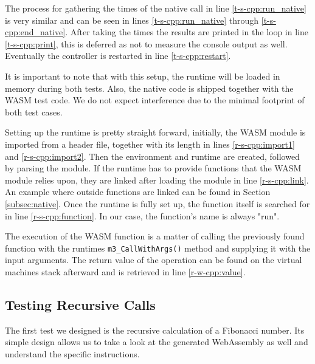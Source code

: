 The process for gathering the times of the native call in line \ref{t-s-cpp:run_native} is very similar and can be seen in lines \ref{t-s-cpp:run_native} through \ref{t-s-cpp:end_native}. After taking the times the results are printed in the loop in line \ref{t-s-cpp:print}, this is deferred as not to measure the console output as well. Eventually the controller is restarted in line \ref{t-s-cpp:restart}.

It is important to note that with this setup, the runtime will be loaded in memory during both tests. Also, the native code is shipped together with the WASM test code. We do not expect interference due to the minimal footprint of both test cases.



Setting up the runtime is pretty straight forward, initially, the WASM module is imported from a header file, together with its length in lines \ref{r-s-cpp:import1} and \ref{r-s-cpp:import2}. Then the environment and runtime are created, followed by parsing the module. If the runtime has to provide functions that the WASM module relies upon, they are linked after loading the module in line \ref{r-s-cpp:link}. An example where outside functions are linked can be found in Section \ref{subsec:native}. Once the runtime is fully set up, the function itself is searched for in line \ref{r-s-cpp:function}. In our case, the function's name is always "run".



The execution of the WASM function is a matter of calling the previously found function with the runtimes \lstinline{m3_CallWithArgs()} method and supplying it with the input arguments. The return value of the operation can be found on the virtual machines stack afterward and is retrieved in line \ref{r-w-cpp:value}.

\subsection{Testing Recursive Calls}\label{subsec:m_test_recursive}

The first test we designed is the recursive calculation of a Fibonacci number. Its simple design allows us to take a look at the generated WebAssembly as well and understand the specific instructions.

